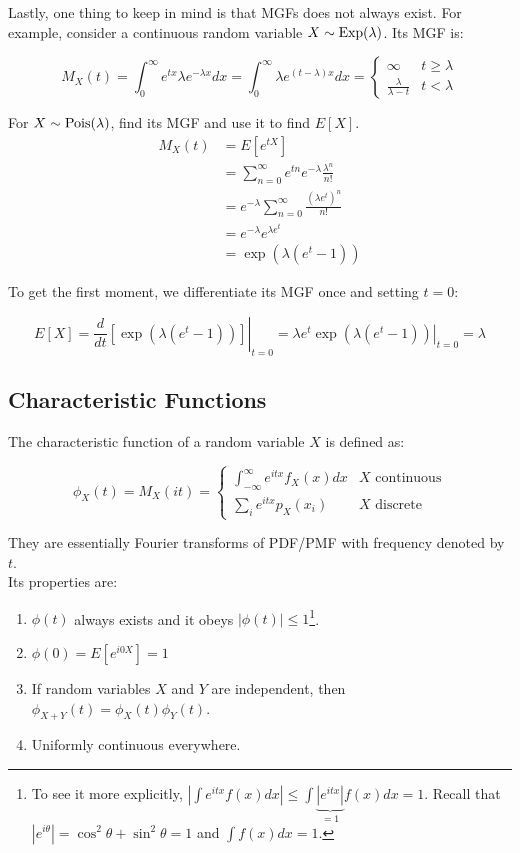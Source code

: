 Lastly, one thing to keep in mind is that MGFs does not always exist. For example, consider a continuous random variable $X\sim\operatorname{Exp}(\lambda)$. Its MGF is:

\[M_X(t)=\int_0^\infty e^{tx} \lambda e^{-\lambda x} dx=\int_0^\infty \lambda e^{(t-\lambda)x} dx=\begin{cases} \infty & t \ge \lambda \\ \frac{\lambda}{\lambda-t} & t<\lambda \end{cases}\]

\begin{texample}
	For $X\sim\operatorname{Pois}(\lambda)$, find its MGF and use it to find $E[X]$. \\
	
	\begin{align*}
		M_X(t)&=E[e^{tX}] \\
		&=\sum_{n=0}^\infty e^{tn} e^{-\lambda} \frac{\lambda^n}{n!} \\
		&=e^{-\lambda} \sum_{n=0}^\infty \frac{(\lambda e^t)^n}{n!} \\
		&=e^{-\lambda}e^{\lambda e^t} \\
		&=\exp(\lambda (e^t-1))
	\end{align*}
	
	To get the first moment, we differentiate its MGF once and setting $t=0$:
	
	\[E[X]=\left.\frac{d}{dt}\left[\exp(\lambda (e^t-1))\right]\right\vert_{t=0}=\left.\lambda e^t\exp(\lambda (e^t-1))\right\vert_{t=0}=\lambda\]
\end{texample}

\subsection{Characteristic Functions}

The characteristic function of a random variable $X$ is defined as:

\[\phi_X(t)=M_X(it)=\begin{cases} \displaystyle\int_{-\infty}^\infty e^{itx} f_X(x) dx & \text{$X$ continuous} \\[20pt] \displaystyle\sum_i e^{itx} p_X(x_i) & \text{$X$ discrete} \end{cases}\]

They are essentially Fourier transforms of PDF/PMF with frequency denoted by $t$. \\

Its properties are:

\begin{enumerate}[i]
	\item $\phi(t)$ always exists and it obeys $|\phi(t)|\le1$\footnote{To see it more explicitly, $\displaystyle \left\vert \int e^{itx}f(x)dx\right\vert \le \int \underbrace{|e^{itx}|}_{=1}f(x)dx=1$. Recall that $|e^{i\theta}|=\cos^2\theta+\sin^2\theta=1$ and $\displaystyle \int f(x) dx=1$.}.
	\item $\phi(0)=E[e^{i0X}]=1$
	\item If random variables $X$ and $Y$ are independent, then $\phi_{X+Y}(t)=\phi_X(t)\phi_Y(t)$.
	\item Uniformly continuous everywhere.
\end{enumerate}

